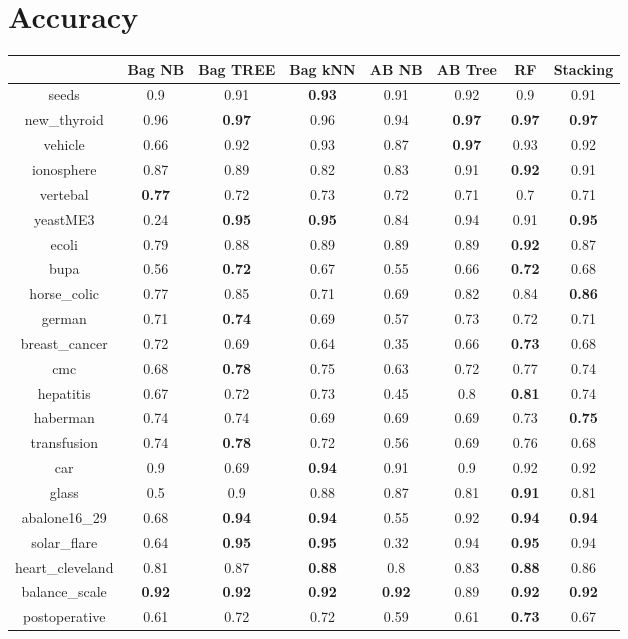 \documentclass{article}%
\begin{document}
%
\normalsize%
\section*{Accuracy}%
\begin{tabular}{c|ccccccc}%
&Bag NB&Bag TREE&Bag kNN&AB NB&AB Tree&RF&Stacking\\%
\hline%
seeds&0.9&0.91&\textbf{0.93}&0.91&0.92&0.9&0.91\\%
new\_thyroid&0.96&\textbf{0.97}&0.96&0.94&\textbf{0.97}&\textbf{0.97}&\textbf{0.97}\\%
vehicle&0.66&0.92&0.93&0.87&\textbf{0.97}&0.93&0.92\\%
ionosphere&0.87&0.89&0.82&0.83&0.91&\textbf{0.92}&0.91\\%
vertebal&\textbf{0.77}&0.72&0.73&0.72&0.71&0.7&0.71\\%
yeastME3&0.24&\textbf{0.95}&\textbf{0.95}&0.84&0.94&0.91&\textbf{0.95}\\%
ecoli&0.79&0.88&0.89&0.89&0.89&\textbf{0.92}&0.87\\%
bupa&0.56&\textbf{0.72}&0.67&0.55&0.66&\textbf{0.72}&0.68\\%
horse\_colic&0.77&0.85&0.71&0.69&0.82&0.84&\textbf{0.86}\\%
german&0.71&\textbf{0.74}&0.69&0.57&0.73&0.72&0.71\\%
breast\_cancer&0.72&0.69&0.64&0.35&0.66&\textbf{0.73}&0.68\\%
cmc&0.68&\textbf{0.78}&0.75&0.63&0.72&0.77&0.74\\%
hepatitis&0.67&0.72&0.73&0.45&0.8&\textbf{0.81}&0.74\\%
haberman&0.74&0.74&0.69&0.69&0.69&0.73&\textbf{0.75}\\%
transfusion&0.74&\textbf{0.78}&0.72&0.56&0.69&0.76&0.68\\%
car&0.9&0.69&\textbf{0.94}&0.91&0.9&0.92&0.92\\%
glass&0.5&0.9&0.88&0.87&0.81&\textbf{0.91}&0.81\\%
abalone16\_29&0.68&\textbf{0.94}&\textbf{0.94}&0.55&0.92&\textbf{0.94}&\textbf{0.94}\\%
solar\_flare&0.64&\textbf{0.95}&\textbf{0.95}&0.32&0.94&\textbf{0.95}&0.94\\%
heart\_cleveland&0.81&0.87&\textbf{0.88}&0.8&0.83&\textbf{0.88}&0.86\\%
balance\_scale&\textbf{0.92}&\textbf{0.92}&\textbf{0.92}&\textbf{0.92}&0.89&\textbf{0.92}&\textbf{0.92}\\%
postoperative&0.61&0.72&0.72&0.59&0.61&\textbf{0.73}&0.67\\%
\end{tabular}
\end{document}
